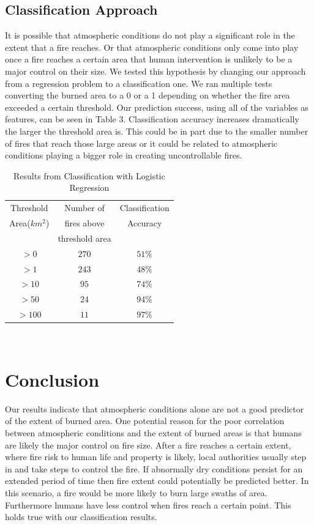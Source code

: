 \documentclass{article}
\begin{document}
\subsection{Classification Approach}

It is possible that atmospheric conditions do not play a significant role in the extent that a fire reaches. Or that atmospheric conditions only come into play once a fire reaches a certain area that human intervention is unlikely to be a major control on their size. We tested this hypothesis by changing our approach from a regression problem to a classification one. We ran multiple tests converting the burned area to a 0 or a 1 depending on whether the fire area exceeded a certain threshold. Our prediction success, using all of the variables as features, can be seen in Table 3. Classification accuracy increases dramatically the larger the threshold area is. This could be in part due to the smaller number of fires that reach those large areas or it could be related to atmospheric conditions playing a bigger role in creating uncontrollable fires.

\begin{center}
\centering
\begin{table}
\begin{tabular}{| c | c | c |}
\hline
Threshold & Number of & Classification \\
Area($km^2$) & fires above & Accuracy \\
 & threshold area & \\
\hline
$>0$ & $270$ & $51\%$ \\ 
$>1$ & $243$ & $48\%$ \\ 
$>10$ & $95$ & $74\%$ \\ 
$>50$ & $24$ & $94\%$ \\ 
$>100$ & $11$ & $97\%$ \\
\hline
\end{tabular}
\\
\caption{Results from Classification with Logistic Regression}
\end{table}
\end{center}

\section{Conclusion}

Our results indicate that atmospheric conditions alone are not a good predictor of the extent of burned area. One potential reason for the poor correlation between atmospheric conditions and the extent of burned areas is that humans are likely the major control on fire size. After a fire reaches a certain extent, where fire risk to human life and property is likely, local authorities usually step in and take steps to control the fire. If abnormally dry conditions persist for an extended period of time then fire extent could potentially be predicted better. In this scenario, a fire would be more likely to burn large swaths of area. Furthermore humans have less control when fires reach a certain point. This holds true with our classification results.
\end{document}
